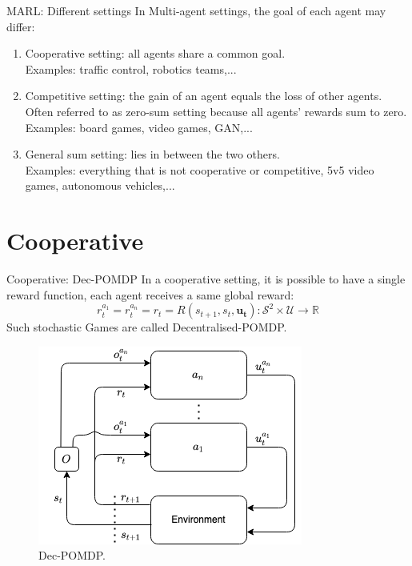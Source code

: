\documentclass[9pt, hyperref={pdfusetitle,colorlinks=true,allcolors=DarkBlue}]{beamer}
\begin{document}
\begin{frame}{MARL: Different settings}
In Multi-agent settings, the goal of each agent may differ:
\vfill
\begin{enumerate}
    \item Cooperative setting: all agents share a common goal.
    \\Examples: traffic control, robotics teams,...
    \vfill
    \item Competitive setting: the gain of an agent equals the loss of other agents.
    \\Often referred to as zero-sum setting because all agents' rewards sum to zero.
    \\Examples: board games, video games, GAN,...
    \vfill
    \item General sum setting: lies in between the two others.
    \\Examples: everything that is not cooperative or competitive, 5v5 video games, autonomous vehicles,...
\end{enumerate}
\end{frame}

\section{Cooperative}

\begin{frame}{Cooperative: Dec-POMDP}
In a cooperative setting, it is possible to have a single reward function, each agent receives a same global reward:
\begin{equation*}
    r^{a_1}_t = r^{a_n}_t=r_t = R(s_{t+1}, s_t, \boldsymbol{u_t}): \mathcal{S}^2 \times \mathcal{U} \rightarrow \mathbb{R}
\end{equation*}
Such stochastic Games are called Decentralised-POMDP.
\begin{figure}
    \centering
    \includegraphics[scale=0.45]{dec-poMDP.png}
    \caption{Dec-POMDP.}

\end{figure}
\end{frame}
\end{document}
